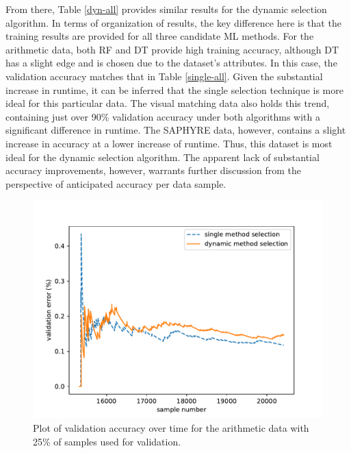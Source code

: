 \documentclass[12pt]{uthesis-v12}  %
\begin{document}
From there, Table \ref{dyn-all} provides similar results for the dynamic selection algorithm. In terms of organization of results, the key difference here is that the training results are provided for all three candidate ML methods. For the arithmetic data, both RF and DT provide high training accuracy, although DT has a slight edge and is chosen due to the dataset's attributes. In this case, the validation accuracy matches that in Table \ref{single-all}. Given the substantial increase in runtime, it can be inferred that the single selection technique is more ideal for this particular data. The visual matching data also holds this trend, containing just over 90\% validation accuracy under both algorithms with a significant difference in runtime. The SAPHYRE data, however, contains a slight increase in accuracy at a lower increase of runtime. Thus, this dataset is most ideal for the dynamic selection algorithm. The apparent lack of substantial accuracy improvements, however, warrants further discussion from the perspective of anticipated accuracy per data sample.

\begin{figure}[!t]
\centering
\includegraphics[width=\textwidth]{switching/nata/0.25/nata25}
\caption{Plot of validation accuracy over time for the arithmetic data with 25\% of samples used for validation.}
\label{nata-25}
\end{figure}
\end{document}
